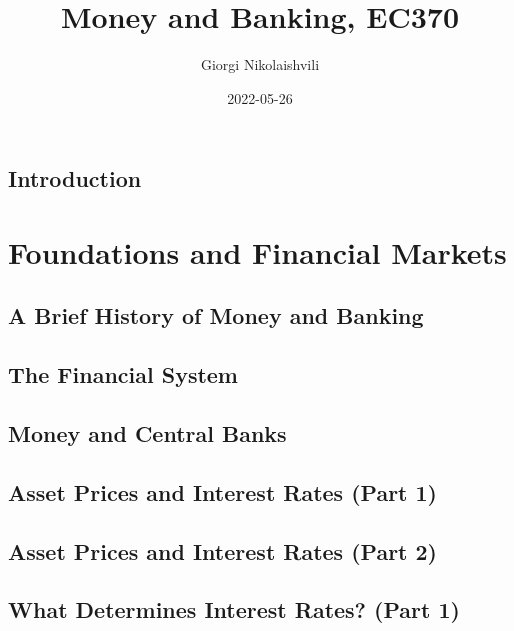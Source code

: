 \documentclass[
]{book}
\title{Money and Banking, EC370}
\author{Giorgi Nikolaishvili}
\date{2022-05-26}
\begin{document}
\maketitle

{
\setcounter{tocdepth}{1}
\tableofcontents
}
\hypertarget{introduction}{%
\chapter*{Introduction}\label{introduction}}

\hypertarget{part-foundations-and-financial-markets}{%
\part{Foundations and Financial Markets}\label{part-foundations-and-financial-markets}}

\hypertarget{a-brief-history-of-money-and-banking}{%
\chapter{A Brief History of Money and Banking}\label{a-brief-history-of-money-and-banking}}

\hypertarget{the-financial-system}{%
\chapter{The Financial System}\label{the-financial-system}}

\hypertarget{money-and-central-banks}{%
\chapter{Money and Central Banks}\label{money-and-central-banks}}

\hypertarget{asset-prices-and-interest-rates-part-1}{%
\chapter{Asset Prices and Interest Rates (Part 1)}\label{asset-prices-and-interest-rates-part-1}}

\hypertarget{asset-prices-and-interest-rates-part-2}{%
\chapter{Asset Prices and Interest Rates (Part 2)}\label{asset-prices-and-interest-rates-part-2}}

\hypertarget{what-determines-interest-rates-part-1}{%
\chapter{What Determines Interest Rates? (Part 1)}\label{what-determines-interest-rates-part-1}}
\end{document}
